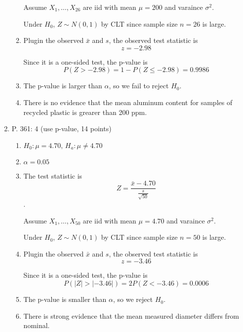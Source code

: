 \documentclass{article}\usepackage[]{graphicx}\usepackage[]{color}
\begin{document}
\begin{enumerate}
\begin{enumerate}[label = \arabic*.]
	Assume $X_1, \ldots, X_{26}$ are iid with mean $\mu = 200$ and varaince $\sigma^2$.
	
	Under $H_0$, $Z \sim N(0,1)$ by CLT since sample size $n = 26$ is large. 
	
	\item Plugin the observed $\bar{x}$ and $s$, the observed test statistic is
	\[z = -2.98\]
	
	Since it is a one-sided test, the p-value is
	\[P(Z > -2.98) = 1 - P(Z \leq -2.98) = 0.9986\]
	
	\item
	The p-value is larger than $\alpha$, so we fail to reject $H_0$.
	
	\item
	There is no evidence that the mean aluminum content for samples of recycled plastic is grearer than 200 ppm.
	\end{enumerate}
	\item P. 361: 4 (use p-value, 14 points)
	\begin{enumerate}[label = \arabic*.]
	\item $H_0 : \mu = 4.70, \, H_a: \mu \neq 4.70$
	\item $\alpha = 0.05$
	\item The test statistic is
	\[Z= \frac{\bar{x} - 4.70}{\frac{s}{\sqrt{50}}}\].
	
	Assume $X_1, \ldots, X_{50}$ are iid with mean $\mu = 4.70$ and varaince $\sigma^2$.
	
	Under $H_0$, $Z \sim N(0,1)$ by CLT since sample size $n = 50$ is large. 
	
	\item Plugin the observed $\bar{x}$ and $s$, the observed test statistic is
	\[z = -3.46\]
	
	Since it is a one-sided test, the p-value is
	\[P(|Z| > |-3.46|) = 2P(Z < -3.46) = 0.0006\]
	
	\item
	The p-value is smaller than $\alpha$, so we reject $H_0$.
	
	\item
	There is strong evidence that the mean measured diameter differs from nominal.
	\end{enumerate}

\end{enumerate}

% 
%
\end{document}
